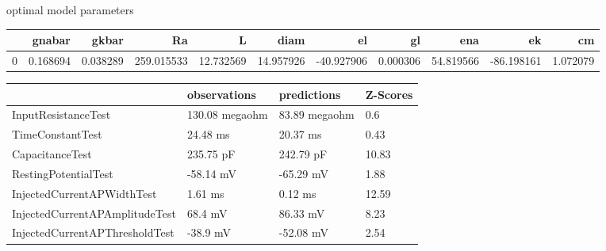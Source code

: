 optimal model parameters
\begin{tabular}{lrrrrrrrrrr}
\toprule
{} &    gnabar &     gkbar &          Ra &          L &       diam &         el &        gl &        ena &         ek &        cm \\
\midrule
0 &  0.168694 &  0.038289 &  259.015533 &  12.732569 &  14.957926 & -40.927906 &  0.000306 &  54.819566 & -86.198161 &  1.072079 \\
\bottomrule
\end{tabular}
\begin{tabular}{llll}
\toprule
{} &    observations &    predictions & Z-Scores \\
\midrule
InputResistanceTest            &  130.08 megaohm &  83.89 megaohm &      0.6 \\
TimeConstantTest               &        24.48 ms &       20.37 ms &     0.43 \\
CapacitanceTest                &       235.75 pF &      242.79 pF &    10.83 \\
RestingPotentialTest           &       -58.14 mV &      -65.29 mV &     1.88 \\
InjectedCurrentAPWidthTest     &         1.61 ms &        0.12 ms &    12.59 \\
InjectedCurrentAPAmplitudeTest &         68.4 mV &       86.33 mV &     8.23 \\
InjectedCurrentAPThresholdTest &        -38.9 mV &      -52.08 mV &     2.54 \\
\bottomrule
\end{tabular}

